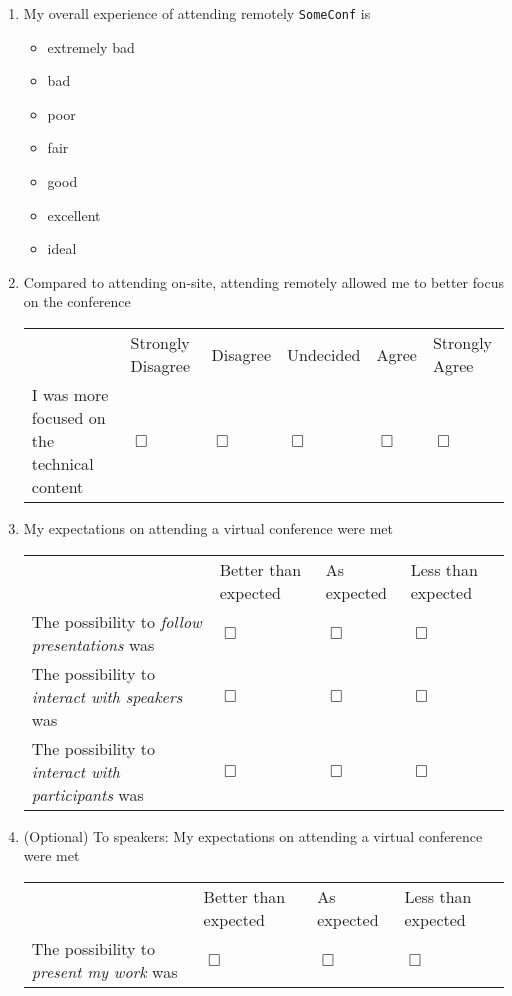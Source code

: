 \documentclass[sigconf]{acmart}
\newcommand{\confname}[0]{\texttt{SomeConf}\xspace}
\newcommand{\QO}{$\Box$}%
\newenvironment{Qlist}{%
\renewcommand{\labelitemi}{\QO}
\begin{itemize}[leftmargin=1.5em,topsep=-.5em]
}{%
\end{itemize}
}
\begin{document}
\begin{appendix}
\begin{enumerate}
	\item My overall experience of attending remotely \confname is
		\begin{Qlist}
			\item extremely bad
			\item bad
			\item poor
			\item fair
			\item good
			\item excellent
			\item ideal
		\end{Qlist}

	\item Compared to attending on-site, attending remotely allowed me to better focus on the conference

		\begin{tabular}{p{2cm}p{.8cm}p{.9cm}p{.9cm}p{.9cm}p{.9cm}}
			\hline
			& Strongly Disagree & Disagree & Undecided & Agree & Strongly Agree\\
			 
			I was more focused on the technical content & \QO & \QO & \QO & \QO & \QO \\
		\end{tabular}


	\item My expectations on attending a virtual conference were met 

		\begin{tabular}{p{2cm}p{1.5cm}p{1.5cm}p{1.5cm}}
			\hline
			& Better than expected & As expected & Less than expected\\
			The possibility to \emph{follow presentations} was & \QO & \QO & \QO\\
			\hline
			The possibility to \emph{interact with speakers} was & \QO & \QO & \QO\\
			\hline
			The possibility to \emph{interact with participants} was  & \QO & \QO & \QO\\
		\end{tabular}

	\item (Optional) To speakers: My expectations on attending a virtual conference were met

		\begin{tabular}{p{2cm}p{1.5cm}p{1.5cm}p{1.5cm}}
			\hline
			& Better than expected & As expected & Less than expected\\
			The possibility to \emph{present my work} was & \QO & \QO & \QO\\
		\end{tabular}


\end{enumerate}
\end{appendix}
\end{document}
